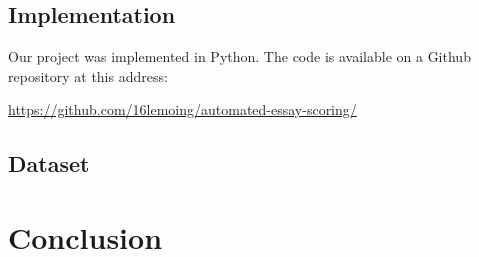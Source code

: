 \documentclass[a4paper,12pt,english]{article}
\begin{document}
\subsection{Implementation}

Our project was implemented in Python. The code is available on a Github repository at this address:

\begin{center}
	\url{https://github.com/16lemoing/automated-essay-scoring/} 
\end{center}

\subsection{Dataset}

\section{Conclusion}

 

\end{document}
